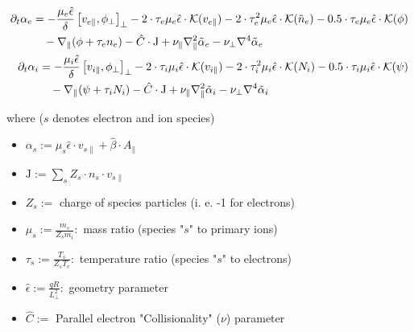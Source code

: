 \documentclass[master.tex]{subfiles}
\begin{document}
\begin{align}
\begin{split}
    \partial_t \alpha_e &=  -\frac{\mu_e \hat{\epsilon}}{\delta} \left[v_{e\parallel}, \phi_\perp\right]_\perp
    - 2 \cdot \tau_e \mu_e \hat{\epsilon} \cdot \mathcal{K}( v_{e\parallel})
    - 2 \cdot \tau_e^2 \mu_e \hat{\epsilon} \cdot \mathcal{K}(\Tilde{n}_e)
    - 0.5 \cdot \tau_e \mu_e \hat{\epsilon} \cdot \mathcal{K}( \phi)\\
    & \quad - \nabla_\parallel (\phi + \tau_e n_e)
    - \hat{C} \cdot \mathrm{J}
    + \nu_\parallel \nabla_\parallel^2\Tilde{\alpha}_e 
    - \nu_\perp \nabla^4\Tilde{\alpha}_e \label{eq:electron_velocity}
\end{split}\\
\begin{split}
    \partial_t \alpha_i &= -\frac{\mu_i \hat{\epsilon}}{\delta}  \left[v_{i\parallel}, \phi_\perp\right]_\perp
    - 2 \cdot \tau_i \mu_i \hat{\epsilon} \cdot \mathcal{K}(v_{i\parallel})
    - 2 \cdot \tau_i^2 \mu_i \hat{\epsilon} \cdot \mathcal{K}(N_i)
    - 0.5 \cdot \tau_i \mu_i \hat{\epsilon} \cdot \mathcal{K}(\psi)\\
    &\quad - \nabla_\parallel (\psi + \tau_i N_i)
    - \hat{C} \cdot  \mathrm{J}
    + \nu_\parallel\nabla_\parallel^2\Tilde{\alpha}_i 
    - \nu_\perp \nabla^4\Tilde{\alpha}_i \label{eq:ion_velocity}
\end{split}
\end{align}

where ($s$ denotes electron and ion species)

\begin{itemize}
    \item $\alpha_s := \mu_s \hat{\epsilon} \cdot v_{s\parallel} + \hat{\beta} \cdot A_{\parallel}$
    \item $\mathrm{J} := \sum_s Z_s \cdot n_s \cdot v_{s\parallel}$
    \item $Z_s :=$ charge of species particles (i. e. -1 for electrons)
    \item $\mu_s := \frac{m_s}{Z_s m_i}\colon$ mass ratio (species "$s$" to primary ions)
    \item $\tau_s := \frac{T_s}{Z_s T_e}\colon$ temperature ratio (species "$s$" to electrons) 
    \item $\hat{\epsilon} := \frac{qR}{L_\perp^2}\colon$ geometry parameter
    \item $\hat{C} := $ Parallel electron "Collisionality" ($\nu$) parameter
\end{itemize}
\end{document}
